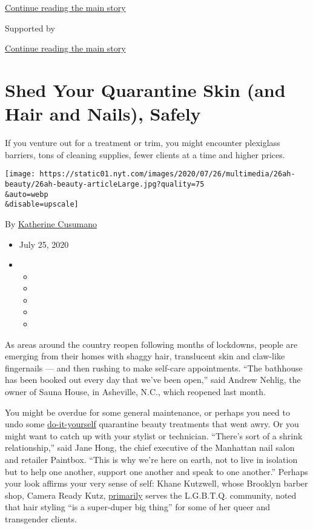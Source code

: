 \protect\hyperlink{after-top}{Continue reading the main story}

Supported by

\protect\hyperlink{after-sponsor}{Continue reading the main story}

\hypertarget{shed-your-quarantine-skin-and-hair-and-nails-safely}{%
\section{Shed Your Quarantine Skin (and Hair and Nails),
Safely}\label{shed-your-quarantine-skin-and-hair-and-nails-safely}}

If you venture out for a treatment or trim, you might encounter
plexiglass barriers, tons of cleaning supplies, fewer clients at a time
and higher prices.

\texttt{[image: https://static01.nyt.com/images/2020/07/26/multimedia/26ah-beauty/26ah-beauty-articleLarge.jpg?quality=75\\\&auto=webp\\\&disable=upscale]}

By \href{https://www.nytimes.com/by/katherine-cusumano}{Katherine
Cusumano}

\begin{itemize}
\item
  July 25, 2020
\item
  \begin{itemize}
  \item
  \item
  \item
  \item
  \item
  \end{itemize}
\end{itemize}

As areas around the country reopen following months of lockdowns, people
are emerging from their homes with shaggy hair, translucent skin and
claw-like fingernails --- and then rushing to make self-care
appointments. ``The bathhouse has been booked out every day that we've
been open,'' said Andrew Nehlig, the owner of Sauna House, in Asheville,
N.C., which reopened last month.

You might be overdue for some general maintenance, or perhaps you need
to undo some
\href{https://www.nytimes.com/2020/04/02/t-magazine/home-hair-care-tips-coronavirus.html}{do-it-yourself}
quarantine beauty treatments that went awry. Or you might want to catch
up with your stylist or technician. ``There's sort of a shrink
relationship,'' said Jane Hong, the chief executive of the Manhattan
nail salon and retailer Paintbox. ``This is why we're here on earth, not
to live in isolation but to help one another, support one another and
speak to one another.'' Perhaps your look affirms your very sense of
self: Khane Kutzwell, whose Brooklyn barber shop, Camera Ready Kutz,
\href{https://www.nytimes.com/2020/03/11/nyregion/nyc-queer-black-barbershops.html}{primarily}
serves the L.G.B.T.Q. community, noted that hair styling ``is a
super-duper big thing'' for some of her queer and transgender clients.

